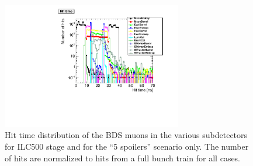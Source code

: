 \begin{figure}[htbp!]
\centering
\includegraphics[width=0.7\textwidth]{Figures/BDS_muons/hittime_ILC500_spoilers_superimposed.pdf}
\caption[Muon hit time in the \sid subdetectors]{Hit time distribution of the BDS muons in the various \sid subdetectors for ILC500 stage and for the ``5 spoilers'' scenario only.
The number of hits are normalized to hits from a full bunch train for all cases.}
\label{fig:BDS_Muons:hittime}
\end{figure}

